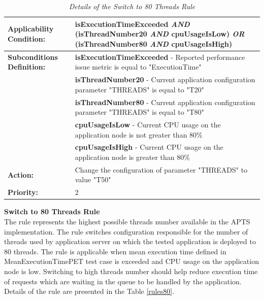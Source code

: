 \documentclass[10pt,a4paper]{article}
\begin{document}
\begin{table}[!htb]
\def\arraystretch{1.5}
\caption{\textit{Details of the Switch to 80 Threads Rule}} \label{rules50}
\begin{tabularx}{\textwidth}{p{2.1cm}|X}

\textbf{Applicability Condition:} & \textbf{isExecutionTimeExceeded} \textit{AND} \newline
(\textbf{isThreadNumber20} \textit{AND} \textbf{cpuUsageIsLow}) \textit{OR} \newline
(\textbf{isThreadNumber80} \textit{AND} \textbf{cpuUsageIsHigh}) \\ \hline

\textbf{Subconditions Definition:} & \textbf{isExecutionTimeExceeded} -  Reported performance issue metric is equal to "ExecutionTime"  \\
& \textbf{isThreadNumber20} -  Current application configuration parameter "THREADS" is equal to "T20" \\
& \textbf{isThreadNumber80} -  Current application configuration parameter "THREADS" is equal to "T80" \\
& \textbf{cpuUsageIsLow} - Current CPU usage on the application node is not greater than 80\% \\ \hline
& \textbf{cpuUsageIsHigh} - Current CPU usage on the application node is greater than 80\% \\ \hline

\textbf{Action:} & Change the configuration of parameter "THREADS" to value "T50" \\ \hline
\textbf{Priority:} & 2\\
\end{tabularx}
\end{table}

\vspace{5mm}
\noindent\textbf{Switch to 80 Threads Rule} \\
The rule represents the highest possible threads number available in the APTS implementation. The rule switches configuration responsible for the number of threads used by application server on which the tested application is deployed to 80 threads. The rule is applicable when mean execution time defined in MeanExecutionTimePET test case is exceeded and CPU usage on the application node is low. Switching to high threads number should help reduce execution time of requests which are waiting in the queue to be handled by the application. Details of the rule are presented in the Table \ref{rules80}.
\end{document}
